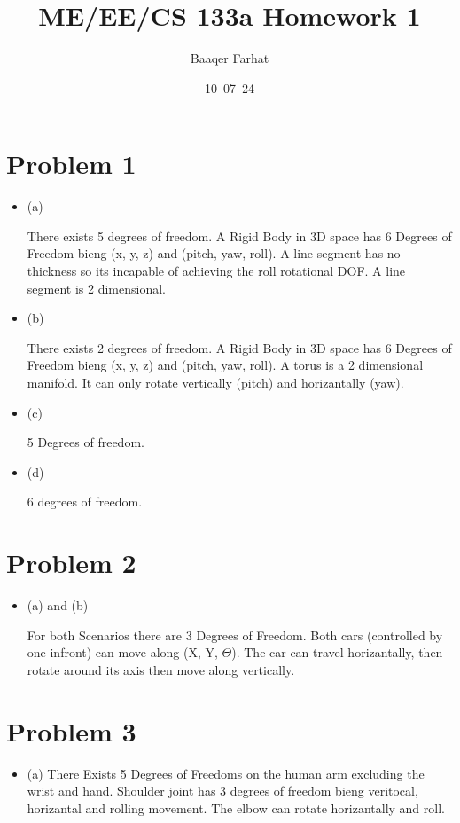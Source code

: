 \documentclass[12pt]{article}
\title{ME/EE/CS 133a Homework 1}
\author{Baaqer Farhat}
\date{10–07–24}
\begin{document}
\maketitle

\section{Problem 1}

\begin{itemize}

\item (a) 

There exists 5 degrees of freedom. A Rigid Body in 3D space has 6 Degrees of Freedom bieng (x, y, z) and (pitch, yaw, roll).
A line segment has no thickness so its incapable of achieving the roll rotational DOF. A line segment is 2 dimensional. 

\item (b)

There exists 2 degrees of freedom. A Rigid Body in 3D space has 6 Degrees of Freedom bieng (x, y, z) and (pitch, yaw, roll). A 
torus is a 2 dimensional manifold. It can only rotate vertically (pitch) and horizantally (yaw). 

\item (c)

5 Degrees of freedom.

\item (d)

6 degrees of freedom.

\end{itemize}

\section{Problem 2}

\begin{itemize}
    \item (a) and (b)

    For both Scenarios there are 3 Degrees of Freedom. Both cars (controlled by one infront) can move along (X, Y, $\Theta$). The 
    car can travel horizantally, then rotate around its axis then move along vertically.

\end{itemize}

\section{Problem 3}

\begin{itemize}
    \item (a)
    There Exists 5 Degrees of Freedoms on the human arm excluding the wrist and hand. Shoulder joint has 3 degrees of freedom bieng veritocal, horizantal and rolling movement. 
    The elbow can rotate horizantally and roll. 
\end{itemize}
\end{document}
